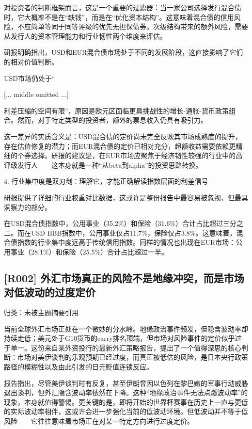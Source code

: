 \documentclass[11pt]{ctexart}
\begin{document}
对投资者的判断框架而言，这是一个重要的过滤器：当一家公司选择发行混合债时，它大概率不是在“缺钱”，而是在“优化资本结构”。这意味着混合债的信用风险，不应简单等同于同等评级的优先无担保债券。次级结构带来的额外风险，需要从发行人的资本管理能力和行业韧性两个维度来评估。

研报明确指出，USD和EUR混合债市场处于不同的发展阶段，这直接影响了它们的相对价值判断。

USD市场仍处于“

[... middle omitted ...]

利差压缩的空间有限”，原因是欧元区面临更具挑战性的增长-通胀-货币政策组合。然而，对于特定类型的投资者，额外的票息收入仍具有吸引力。

这一差异的实质含义是：USD混合债的定价尚未完全反映其市场成熟度的提升，存在估值修复的潜力；而EUR混合债的定价已相对充分，超额收益需要依赖更精细的个券选择。研报的建议是，在EUR市场应聚焦于经济韧性较强的行业中的高评级发行人——这本身就是一种“从beta到alpha”的投资思路转换。

4. 行业集中度是双刃剑：理解它，才能正确解读指数层面的利差信号

研报提供了详细的行业权重对比数据，这或许是整份报告中最容易被忽视、但最具洞察力的部分。

在USD混合债指数中，公用事业（35.2\%）和保险（31.6\%）合计占比超过三分之二。而在USD BBB指数中，公用事业仅占11.7\%，保险仅占3.8\%。这意味着，混合债指数的行业集中度远高于传统信用指数。同样的情况也出现在EUR市场：公用事业（28.1\%）和保险（25.5\%）合计占比超过一半。

\subsection{[R002] 外汇市场真正的风险不是地缘冲突，而是市场对低波动的过度定价}
{\small\color{refgray}归类：未被主题摘要引用}

当前全球外汇市场正处在一个微妙的分水岭。地缘政治事件频发，但隐含波动率却持续走低；美元处于G10货币的carry排名顶端，但市场对风险事件的定价似乎过于单一。这份来自某外资投行的最新外汇策略报告，提出了一个值得深思的核心判断：市场对美伊谈判的乐观预期已经过度，而真正被低估的风险，是日本央行政策路径的模糊性以及由此引发的日元贬值连锁反应。

报告指出，尽管美伊谈判时有反复，甚至伊朗曾因以色列在黎巴嫩的军事行动威胁退出谈判，但外汇隐含波动率依然在下降。这种“地缘政治事件无法点燃波动率”的现象，本身就值得警惕。更关键的是，即将开始的世界杯赛事在历史上一直与更低的实际波动率相伴，这或许会进一步强化当前的低波动环境。但低波动并不等于低风险——它往往意味着市场正在对某一特定方向进行过度定价。
\end{document}
